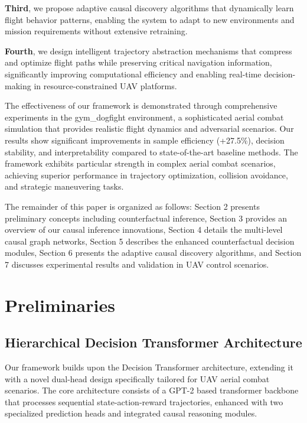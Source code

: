 \documentclass[12pt]{article}
\begin{document}
\textbf{Third}, we propose adaptive causal discovery algorithms that dynamically learn flight behavior patterns, enabling the system to adapt to new environments and mission requirements without extensive retraining.

\textbf{Fourth}, we design intelligent trajectory abstraction mechanisms that compress and optimize flight paths while preserving critical navigation information, significantly improving computational efficiency and enabling real-time decision-making in resource-constrained UAV platforms.

The effectiveness of our framework is demonstrated through comprehensive experiments in the gym\_dogfight environment, a sophisticated aerial combat simulation that provides realistic flight dynamics and adversarial scenarios. Our results show significant improvements in sample efficiency (+27.5\%), decision stability, and interpretability compared to state-of-the-art baseline methods. The framework exhibits particular strength in complex aerial combat scenarios, achieving superior performance in trajectory optimization, collision avoidance, and strategic maneuvering tasks.

The remainder of this paper is organized as follows: Section 2 presents preliminary concepts including counterfactual inference, Section 3 provides an overview of our causal inference innovations, Section 4 details the multi-level causal graph networks, Section 5 describes the enhanced counterfactual decision modules, Section 6 presents the adaptive causal discovery algorithms, and Section 7 discusses experimental results and validation in UAV control scenarios.

\section{Preliminaries}

\subsection{Hierarchical Decision Transformer Architecture}

Our framework builds upon the Decision Transformer architecture, extending it with a novel dual-head design specifically tailored for UAV aerial combat scenarios. The core architecture consists of a GPT-2 based transformer backbone that processes sequential state-action-reward trajectories, enhanced with two specialized prediction heads and integrated causal reasoning modules.
\end{document}
